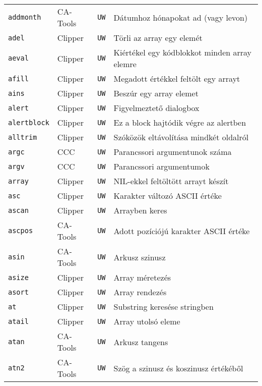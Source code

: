\begin{tabular}{|l|l|l|l|}
\verb!addmonth!                    & CA-Tools &  {\tt UW} & Dátumhoz hónapokat ad (vagy levon)\\
\verb!adel!                        & Clipper  &  {\tt UW} & Törli az array egy elemét\\
\verb!aeval!                       & Clipper  &  {\tt UW} & Kiértékel egy kódblokkot minden array elemre\\
\verb!afill!                       & Clipper  &  {\tt UW} & Megadott értékkel feltölt egy arrayt\\
\verb!ains!                        & Clipper  &  {\tt UW} & Beszúr egy array elemet\\
\verb!alert!                       & Clipper  &  {\tt UW} & Figyelmeztető dialogbox\\
\verb!alertblock!                  & Clipper  &  {\tt UW} & Ez a block hajtódik végre az alertben\\
\verb!alltrim!                     & Clipper  &  {\tt UW} & Szóközök eltávolítása mindkét oldalról\\
\verb!argc!                        & CCC      &  {\tt UW} & Parancssori argumentunok száma\\
\verb!argv!                        & CCC      &  {\tt UW} & Parancssori argumentumok\\
\verb!array!                       & Clipper  &  {\tt UW} & NIL-ekkel feltöltött arrayt készít\\
\verb!asc!                         & Clipper  &  {\tt UW} & Karakter változó ASCII értéke\\
\verb!ascan!                       & Clipper  &  {\tt UW} & Arrayben keres\\
\verb!ascpos!                      & CA-Tools &  {\tt UW} & Adott pozíciójú karakter ASCII értéke\\
\verb!asin!                        & CA-Tools &  {\tt UW} & Arkusz szinusz\\
\verb!asize!                       & Clipper  &  {\tt UW} & Array méretezés\\
\verb!asort!                       & Clipper  &  {\tt UW} & Array rendezés\\
\verb!at!                          & Clipper  &  {\tt UW} & Substring keresése stringben\\
\verb!atail!                       & Clipper  &  {\tt UW} & Array utolsó eleme\\
\verb!atan!                        & CA-Tools &  {\tt UW} & Arkusz tangens\\
\verb!atn2!                        & CA-Tools &  {\tt UW} & Szög a szinusz és koszinusz értékéből\\

\end{tabular}
